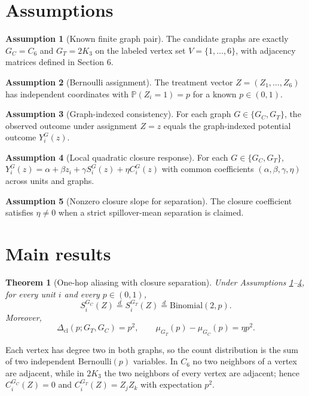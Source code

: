 \documentclass[11pt]{article}
\renewcommand{\Pr}{\mathbb{P}}
\theoremstyle{definition}
\newtheorem{assumption}{Assumption}
\theoremstyle{plain}
\newtheorem{theorem}{Theorem}
\theoremstyle{remark}
\begin{document}
\section{Assumptions}
\begin{assumption}[Known finite graph pair]\label{ass:graphs}
The candidate graphs are exactly \(G_C=C_6\) and \(G_T=2K_3\) on the labeled vertex set \(V=\{1,\ldots,6\}\), with adjacency matrices defined in Section 6.
\end{assumption}

\begin{assumption}[Bernoulli assignment]\label{ass:bernoulli}
The treatment vector \(Z=(Z_1,\ldots,Z_6)\) has independent coordinates with \(\Pr(Z_i=1)=p\) for a known \(p\in(0,1)\).
\end{assumption}

\begin{assumption}[Graph-indexed consistency]\label{ass:consistency}
For each graph \(G\in\{G_C,G_T\}\), the observed outcome under assignment \(Z=z\) equals the graph-indexed potential outcome \(Y_i^G(z)\).
\end{assumption}

\begin{assumption}[Local quadratic closure response]\label{ass:quadratic}
For each \(G\in\{G_C,G_T\}\), \(Y_i^G(z)=\alpha+\beta z_i+\gamma S_i^G(z)+\eta C_i^G(z)\) with common coefficients \((\alpha,\beta,\gamma,\eta)\) across units and graphs.
\end{assumption}

\begin{assumption}[Nonzero closure slope for separation]\label{ass:eta}
The closure coefficient satisfies \(\eta\ne 0\) when a strict spillover-mean separation is claimed.
\end{assumption}

\section{Main results}
\begin{theorem}[One-hop aliasing with closure separation]\label{thm:alias-separation}
Under Assumptions \ref{ass:graphs}--\ref{ass:quadratic}, for every unit \(i\) and every \(p\in(0,1)\),
\[
S_i^{G_C}(Z)\stackrel{d}{=}S_i^{G_T}(Z)\stackrel{d}{=}\mathrm{Binomial}(2,p).
\]
Moreover,
\[
\Delta_{\mathrm{cl}}(p;G_T,G_C)=p^2,\qquad
\mu_{G_T}(p)-\mu_{G_C}(p)=\eta p^2 .
\]
\end{theorem}
Each vertex has degree two in both graphs, so the count distribution is the sum of two independent Bernoulli\((p)\) variables. In \(C_6\) no two neighbors of a vertex are adjacent, while in \(2K_3\) the two neighbors of every vertex are adjacent; hence \(C_i^{G_C}(Z)=0\) and \(C_i^{G_T}(Z)=Z_jZ_k\) with expectation \(p^2\).
\end{document}

